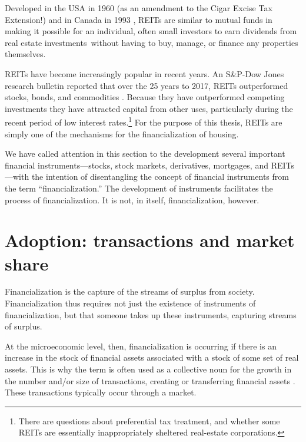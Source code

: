 Developed in the USA  in 1960 (as an amendment to the Cigar Excise Tax Extension!) and in Canada in 1993 \cite{GET_REITsDevelopedDates}, REITs are similar to mutual funds in making it possible for an individual, often small investors to earn dividends from real estate investments without having to buy, manage, or finance any properties themselves. 

REITs have become increasingly popular in recent years.  An S\&P-Dow Jones research bulletin reported that over the  25 years to 2017, REITs outperformed stocks, bonds, and commodities \cite{GET-Dow-Jones-research-bulletin}. %
Because they have outperformed competing investments they have attracted  capital from other uses, particularly during the recent period of low interest rates.\footnote{There are questions about preferential tax treatment, and whether some REITs are essentially inappropriately sheltered real-estate corporations.} For the purpose of this thesis, REITs are simply one of the mechanisms for the financialization of housing.

We have called attention in this section to the development  several important financial instruments---stocks, stock markets, derivatives, mortgages, and REITs---with the intention of  disentangling the concept of financial instruments from the term ``financialization.'' The development of  instruments facilitates the process of financialization. It is not, in itself, financialization, however.

\section{Adoption: transactions and market share}

Financialization is the capture of the streams of surplus from society. Financialization thus requires not just the existence of instruments of financialization, but that someone takes up these instruments, capturing streams of surplus. 


At the microeconomic level, then, financialization  is occurring if there is an increase in the stock of financial assets associated with a stock of some set of real assets. This is why the term is often used as a collective noun for the growth in the number and/or size of  transactions, creating or transferring financial assets \cite{GET_financialization-numberOfTransactions}. These transactions typically occur through a \gls{market}.  

